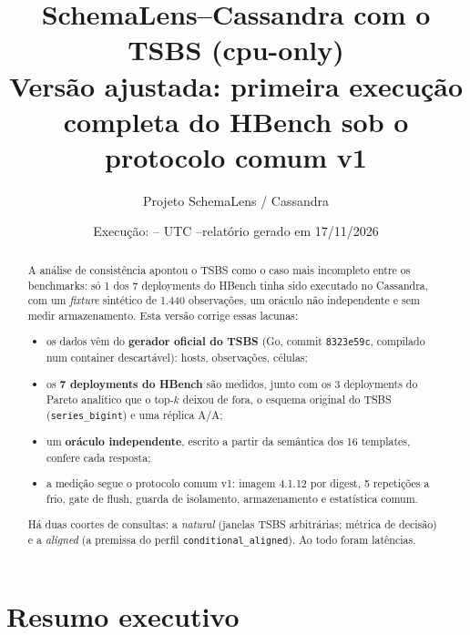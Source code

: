 \documentclass[11pt,a4paper]{article}
\title{\textbf{SchemaLens--Cassandra com o TSBS (cpu-only)}\\[4pt]
\large Versão ajustada: primeira execução completa do HBench sob o protocolo comum v1}
\author{Projeto SchemaLens / Cassandra}
\date{Execução: \envstarted--\envfinished{} UTC \quad--\quad relatório gerado em 17/11/2026}
\begin{document}
\maketitle

\begin{abstract}
\noindent A análise de consistência apontou o TSBS como o caso mais incompleto entre os benchmarks: só 1 dos 7 deployments do HBench tinha sido executado no Cassandra, com um \textit{fixture} sintético de 1.440 observações, um oráculo não independente e sem medir armazenamento. Esta versão corrige essas lacunas:
\begin{itemize}
\item os dados vêm do \textbf{gerador oficial do TSBS} (Go, commit \texttt{8323e59c}, compilado num container descartável): \envhosts{} hosts, \envobs{} observações, \envcells{} células;
\item os \textbf{7 deployments do HBench} são medidos, junto com os 3 deployments do Pareto analítico que o top-$k$ deixou de fora, o esquema original do TSBS (\texttt{series\_bigint}) e uma réplica A/A;
\item um \textbf{oráculo independente}, escrito a partir da semântica dos 16 templates, confere cada resposta;
\item a medição segue o protocolo comum v1: imagem 4.1.12 por digest, 5 repetições a frio, gate de flush, guarda de isolamento, armazenamento e estatística comum.
\end{itemize}
Há duas coortes de consultas: a \emph{natural} (janelas TSBS arbitrárias; métrica de decisão) e a \emph{aligned} (a premissa do perfil \texttt{conditional\_aligned}). Ao todo foram \envrawrows{} latências. 
\end{abstract}

\tableofcontents
\newpage

\section{Resumo executivo}

\end{document}
